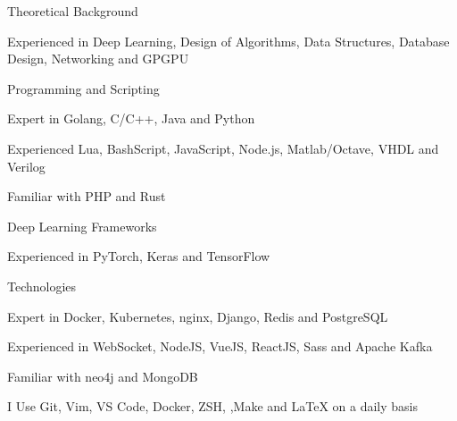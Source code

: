 \begin{cventries}
  \cventryshortlist
    {Theoretical Background}
    {
      \begin{cvitems}
        \item {Experienced in Deep Learning, Design of Algorithms, Data Structures, Database Design, Networking and GPGPU}
      \end{cvitems}
    }

  \cventryshortlist
    {Programming and Scripting}
    {
      \begin{cvitems}
        \item {Expert in Golang, C/C++, Java and Python}
        \item {Experienced Lua, BashScript, JavaScript, Node.js, Matlab/Octave, VHDL and Verilog}
        \item {Familiar with PHP and Rust}
      \end{cvitems}
    }

  \cventryshortlist
    {Deep Learning Frameworks}
    {
      \begin{cvitems}
        \item {Experienced in PyTorch, Keras and TensorFlow}
      \end{cvitems}
    }

  \cventryshortlist
    {Technologies}
    {
      \begin{cvitems}
        \item {Expert in Docker, Kubernetes, nginx, Django, Redis and PostgreSQL}
        \item {Experienced in WebSocket, NodeJS, VueJS, ReactJS, Sass and Apache Kafka}
        \item {Familiar with neo4j and MongoDB}
        \item {I Use Git, Vim, VS Code, Docker, ZSH, ,Make and \mbox{\LaTeX} on a daily basis}
      \end{cvitems}
    }


\end{cventries}
